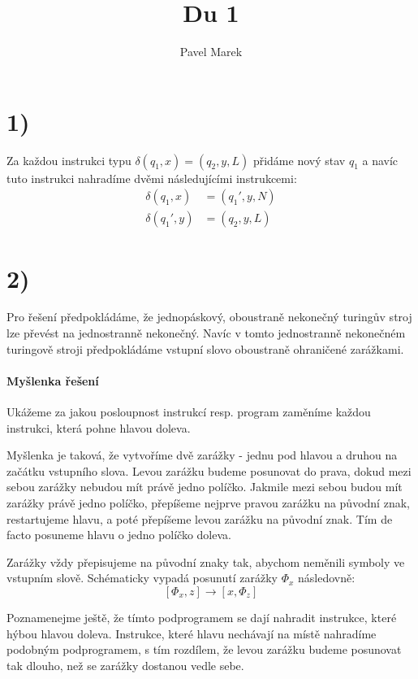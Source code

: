 \documentclass{article}
\begin{document}
\title{Du 1}
\author{Pavel Marek}
\date{}

\maketitle

\section*{1)}
Za každou instrukci typu $ \delta(q_1, x) = (q_2, y, L) $ přidáme nový stav
$q_1$ a navíc tuto instrukci nahradíme dvěmi následujícími instrukcemi:
\begin{align*}
  \delta(q_1, x) &= (q_{1}', y, N)\\
  \delta(q_{1}', y) &= (q_2, y, L)
\end{align*}

\section*{2)}

Pro řešení předpokládáme, že jednopáskový, oboustraně nekonečný turingův
stroj lze převést na jednostranně nekonečný. Navíc v tomto jednostranně
nekonečném turingově stroji předpokládáme vstupní slovo oboustraně ohraničené
zarážkami.

\paragraph{Myšlenka řešení}
Ukážeme za jakou posloupnost instrukcí resp. program zaměníme každou instrukci,
která pohne hlavou doleva.

Myšlenka je taková, že vytvoříme dvě zarážky - jednu pod hlavou a druhou na
začátku vstupního slova. Levou zarážku budeme posunovat do prava, dokud mezi
sebou zarážky nebudou mít právě jedno políčko. Jakmile mezi sebou budou mít
zarážky právě jedno políčko, přepíšeme nejprve pravou zarážku na původní
znak, restartujeme hlavu, a poté přepíšeme levou zarážku na původní znak.
Tím de facto posuneme hlavu o jedno políčko doleva.

Zarážky vždy přepisujeme na původní znaky tak, abychom neměnili symboly ve
vstupním slově. Schématicky vypadá posunutí zarážky $\Phi_x$ následovně:
$$ [\Phi_x, z] \rightarrow [x, \Phi_z] $$

Poznamenejme ještě, že tímto podprogramem se dají nahradit instrukce, které
hýbou hlavou doleva. Instrukce, které hlavu nechávají na místě nahradíme
podobným podprogramem, s tím rozdílem, že levou zarážku budeme posunovat tak
dlouho, než se zarážky dostanou vedle sebe.
\end{document}
